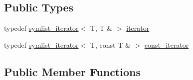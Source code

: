 \subsection*{Public Types}
\begin{DoxyCompactItemize}
\item 
typedef \mbox{\hyperlink{structsymlist__iterator}{symlist\+\_\+iterator}}$<$ T, T \& $>$ \mbox{\hyperlink{classsymlist_a66045fbe3d98975e5537092ede8b50df}{iterator}}
\item 
typedef \mbox{\hyperlink{structsymlist__iterator}{symlist\+\_\+iterator}}$<$ T, const T \& $>$ \mbox{\hyperlink{classsymlist_af15c0ca931299054f83d17a1580a5159}{const\+\_\+iterator}}
\end{DoxyCompactItemize}
\subsection*{Public Member Functions}
